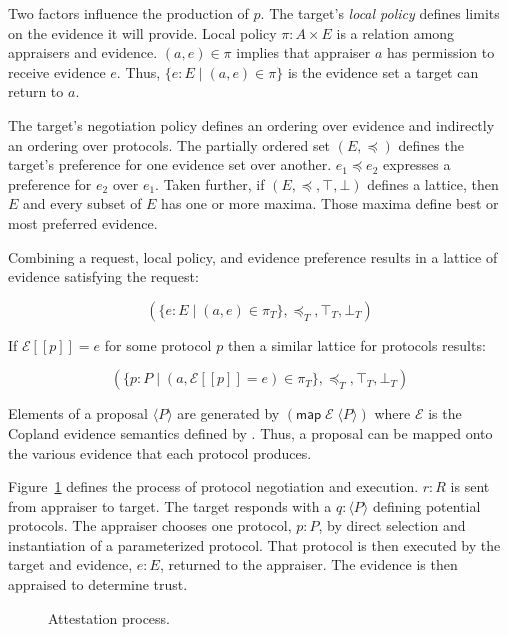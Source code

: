 \documentclass[sigconf,authordraft]{acmart}
\begin{document}
Two factors influence the production of $p$.  The target's \emph{local
policy} defines limits on the evidence it will provide.  Local policy 
$\pi : A\times E$ is a relation among appraisers and evidence.
$(a,e)\in\pi$ implies that appraiser $a$ has permission to receive
evidence $e$.  Thus, $\{e:E\mid (a,e)\in\pi\}$ is the evidence set a target
can return to $a$.

The target's negotiation policy defines an ordering over evidence and
indirectly an ordering over protocols.  The partially ordered set
$(E,\preceq)$ defines the target's preference for one evidence set
over another. $e_1\preceq e_2$ expresses a preference for $e_2$ over
$e_1$.  Taken further, if $(E,\preceq,\top,\bot)$ defines a lattice,
then $E$ and every subset of $E$ has one or more maxima.  Those maxima
define best or most preferred evidence.

Combining a request, local policy, and evidence preference results in
a lattice of evidence satisfying the request:

\[(\{e:E\mid (a,e)\in\pi_T\},\preceq_T,\top_T,\bot_T)\]

If $\mathcal{E}[\![p]\!]=e$ for some protocol $p$ then a similar
lattice for protocols results:

\[(\{p:P\mid (a,\mathcal{E}[\![p]\!]=e)\in\pi_T\},\preceq_T,\top_T,\bot_T)\]


Elements of a proposal $\langle P\rangle$ are generated by
$(\mathsf{map}\; \mathcal{E}\; \langle P\rangle)$ where $\mathcal{E}$
is the Copland evidence semantics defined by \citet{Ramsdell:2019aa}.
Thus, a proposal can be mapped onto the various evidence that each
protocol produces.

Figure~\ref{fig:sequence-fig} defines the process of protocol
negotiation and execution.  $r:R$ is sent from appraiser to
target.  The target responds with a $q:\langle P\rangle$  defining potential
protocols.  The appraiser chooses one protocol, $p:P$, by direct selection and
instantiation of a parameterized protocol.  That protocol is then
executed by the target and evidence, $e:E$, returned to the appraiser.  The
evidence is then appraised to determine trust.

\begin{figure}[hbtp]
  \centering
  
  \caption[Attestation process]{Attestation process.}
  \label{fig:sequence-fig}
\end{figure}
\end{document}
